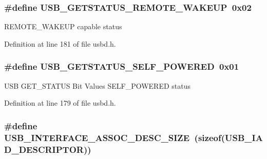 \subsubsection[{\texorpdfstring{U\+S\+B\+\_\+\+G\+E\+T\+S\+T\+A\+T\+U\+S\+\_\+\+R\+E\+M\+O\+T\+E\+\_\+\+W\+A\+K\+E\+UP}{USB_GETSTATUS_REMOTE_WAKEUP}}]{\setlength{\rightskip}{0pt plus 5cm}\#define U\+S\+B\+\_\+\+G\+E\+T\+S\+T\+A\+T\+U\+S\+\_\+\+R\+E\+M\+O\+T\+E\+\_\+\+W\+A\+K\+E\+UP~0x02}\hypertarget{group__USBD__Core_gaad5790ebb5c8f5a25ce60140c60c2ec5}{}\label{group__USBD__Core_gaad5790ebb5c8f5a25ce60140c60c2ec5}
R\+E\+M\+O\+T\+E\+\_\+\+W\+A\+K\+E\+UP capable status 

Definition at line 181 of file usbd.\+h.

\subsubsection[{\texorpdfstring{U\+S\+B\+\_\+\+G\+E\+T\+S\+T\+A\+T\+U\+S\+\_\+\+S\+E\+L\+F\+\_\+\+P\+O\+W\+E\+R\+ED}{USB_GETSTATUS_SELF_POWERED}}]{\setlength{\rightskip}{0pt plus 5cm}\#define U\+S\+B\+\_\+\+G\+E\+T\+S\+T\+A\+T\+U\+S\+\_\+\+S\+E\+L\+F\+\_\+\+P\+O\+W\+E\+R\+ED~0x01}\hypertarget{group__USBD__Core_ga1e801ee37e93522f0f38eff9bc7aac02}{}\label{group__USBD__Core_ga1e801ee37e93522f0f38eff9bc7aac02}
U\+SB G\+E\+T\+\_\+\+S\+T\+A\+T\+US Bit Values S\+E\+L\+F\+\_\+\+P\+O\+W\+E\+R\+ED status 

Definition at line 179 of file usbd.\+h.

\subsubsection[{\texorpdfstring{U\+S\+B\+\_\+\+I\+N\+T\+E\+R\+F\+A\+C\+E\+\_\+\+A\+S\+S\+O\+C\+\_\+\+D\+E\+S\+C\+\_\+\+S\+I\+ZE}{USB_INTERFACE_ASSOC_DESC_SIZE}}]{\setlength{\rightskip}{0pt plus 5cm}\#define U\+S\+B\+\_\+\+I\+N\+T\+E\+R\+F\+A\+C\+E\+\_\+\+A\+S\+S\+O\+C\+\_\+\+D\+E\+S\+C\+\_\+\+S\+I\+ZE~(sizeof({\bf U\+S\+B\+\_\+\+I\+A\+D\+\_\+\+D\+E\+S\+C\+R\+I\+P\+T\+OR}))}\hypertarget{group__USBD__Core_gae377b4fc3e66e90afb99e60fa5cc0a94}{}\label{group__USBD__Core_gae377b4fc3e66e90afb99e60fa5cc0a94}


